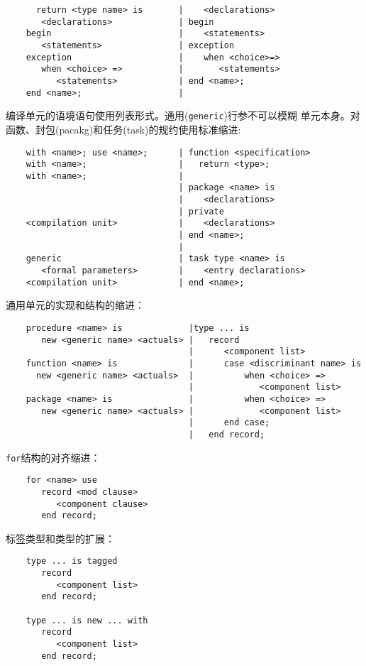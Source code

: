 \begin{blockindent}
\begin{lstlisting}
      return <type name> is       |    <declarations>
       <declarations>             | begin
    begin                         |    <statements>
       <statements>               | exception
    exception                     |    when <choice>=>
       when <choice> =>           |       <statements>
          <statements>            | end <name>;
    end <name>;                   |
\end{lstlisting}
编译单元的语境语句使用列表形式。通用(\texttt{generic})行参不可以模糊
单元本身。对函数、封包(pacakg)和任务(task)的规约使用标准缩进:
\begin{lstlisting}
    with <name>; use <name>;      | function <specification>
    with <name>;                  |   return <type>;
    with <name>;                  |
                                  | package <name> is
                                  |    <declarations>
                                  | private
    <compilation unit>            |    <declarations>
                                  | end <name>;
                                  |
    generic                       | task type <name> is
       <formal parameters>        |    <entry declarations>
    <compilation unit>            | end <name>;

\end{lstlisting}
通用单元的实现和结构的缩进：
\begin{lstlisting}
    procedure <name> is             |type ... is
       new <generic name> <actuals> |   record
                                    |      <component list>
    function <name> is              |      case <discriminant name> is
      new <generic name> <actuals>  |          when <choice> =>
                                    |             <component list>
    package <name> is               |          when <choice> =>
       new <generic name> <actuals> |             <component list>
                                    |      end case;
                                    |   end record;
\end{lstlisting}
\texttt{for}结构的对齐缩进：
\begin{lstlisting}
    for <name> use
       record <mod clause>
          <component clause>
       end record;
\end{lstlisting}
标签类型和类型的扩展：
\begin{lstlisting}
    type ... is tagged
       record
          <component list>
       end record;

    type ... is new ... with
       record
          <component list>
       end record;
\end{lstlisting}
\end{blockindent}

